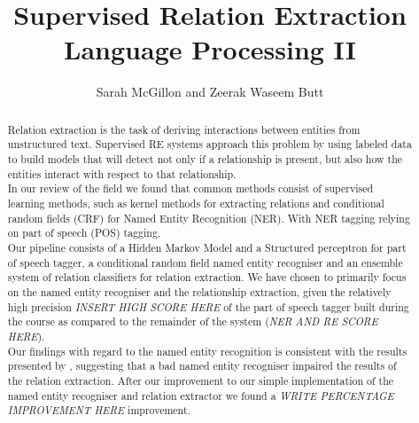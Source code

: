 \documentclass[10pt, a4paper]{article}
\begin{document}
\sloppy
\title{Supervised Relation Extraction\\\large Language Processing II}
\author{Sarah McGillon and Zeerak Waseem Butt}
\maketitle
\begin{abstract}
Relation extraction is the task of deriving interactions between entities from unstructured text. Supervised RE systems approach this problem by using labeled data to build models that will detect not only if a relationship is present, but also how the entities interact with respect to that relationship.\\
In our review of the field we found that common methods consist of supervised learning methods, such as kernel methods for extracting relations and conditional random fields (CRF) for Named Entity Recognition (NER). With NER tagging relying on part of speech (POS) tagging.\\
Our pipeline consists of a Hidden Markov Model and a Structured perceptron for part of speech tagger, a conditional random field named entity recogniser and an ensemble system of relation classifiers for relation extraction. We have chosen to primarily focus on the named entity recogniser and the relationship extraction, given the relatively high precision \emph{INSERT HIGH SCORE HERE} of the part of speech tagger built during the course as compared to the remainder of the system (\emph{NER AND RE SCORE HERE}).\\
Our findings with regard to the named entity recognition is consistent with the results presented by , suggesting that a bad named entity recogniser impaired the results of the relation extraction. After our improvement to our simple implementation of the named entity recogniser and relation extractor we found a \emph{WRITE PERCENTAGE IMPROVEMENT HERE} improvement.

\end{abstract}
\end{document}
